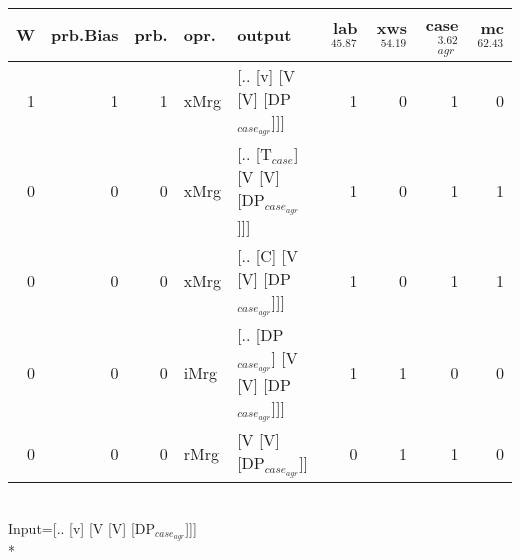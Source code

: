 \begin{tabularx}{\linewidth}{rrrlXrrrr}
\hline
   W &   prb.Bias &   prb. & opr.   & output                                   &   lab$^{45.87}$ &   xws$^{54.19}$ &   case$_{agr}^{3.62}$ &   mc$^{62.43}$ \\
\hline
   1 &       1 &   1 & xMrg & [.. [v] [V [V] [DP$_{case_{agr}}$]]]           &             1 &             0 &                  1 &            0 \\
   0 &       0 &   0 & xMrg & [.. [T$_{case}$] [V [V] [DP$_{case_{agr}}$]]]      &             1 &             0 &                  1 &            1 \\
   0 &       0 &   0 & xMrg & [.. [C] [V [V] [DP$_{case_{agr}}$]]]           &             1 &             0 &                  1 &            1 \\
   0 &       0 &   0 & iMrg & [.. [DP$_{case_{agr}}$] [V [V] [DP$_{case_{agr}}$]]] &             1 &             1 &                  0 &            0 \\
   0 &       0 &   0 & rMrg & [V [V] [DP$_{case_{agr}}$]]                    &             0 &             1 &                  1 &            0 \\
\hline
\end{tabularx}\endgroup\\
\begingroup\scriptsize Input=[.. [v] [V [V] [DP$_{case_{agr}}$]]]\\*
